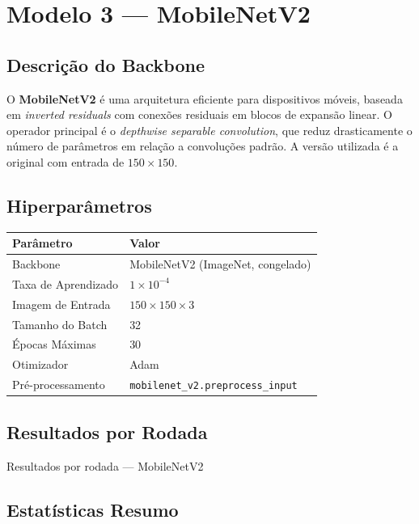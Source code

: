 \documentclass[12pt,a4paper]{article}
\newcommand{\tabelarodadas}[2]{%
  \begin{table}[H]
    \centering
    \caption{#1}
    \begin{adjustbox}{max width=\textwidth, center}
      
    \end{adjustbox}
  \end{table}%
}
\newenvironment{parametros}{%
  \begin{table}[H]
  \centering
  \small
  \begin{tabular}{ll}
  \toprule
  \textbf{Parâmetro} & \textbf{Valor} \\
  \midrule
}{%
  \bottomrule
  \end{tabular}
  \end{table}
}
\begin{document}
\section{Modelo 3 --- MobileNetV2}
\label{sec:mobilenetv2}

\subsection{Descrição do Backbone}

O \textbf{MobileNetV2} \cite{sandler2018mobilenetv2} é uma arquitetura eficiente para dispositivos
móveis, baseada em \emph{inverted residuals} com conexões residuais em blocos de expansão linear.
O operador principal é o \emph{depthwise separable convolution}, que reduz drasticamente o número
de parâmetros em relação a convoluções padrão. A versão utilizada é a original com entrada
de $150\times150$.

\subsection{Hiperparâmetros}

\begin{parametros}
Backbone              & MobileNetV2 (ImageNet, congelado) \\
Taxa de Aprendizado   & $1 \times 10^{-4}$ \\
Imagem de Entrada     & $150 \times 150 \times 3$ \\
Tamanho do Batch      & 32 \\
Épocas Máximas        & 30 \\
Otimizador            & Adam \\
Pré-processamento     & \texttt{mobilenet\_v2.preprocess\_input} \\
\end{parametros}

\subsection{Resultados por Rodada}

\tabelarodadas{Resultados por rodada --- MobileNetV2}%
              {../results/latex/tabela_rodadas_mobilenetv2.tex}

\subsection{Estatísticas Resumo}
\end{document}
